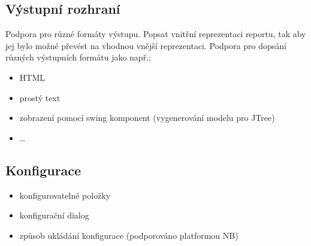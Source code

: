 \subsection{Výstupní rozhraní}
Podpora pro různé formáty výstupu. Popsat vnitřní reprezentaci reportu, tak aby jej bylo možné převést na vhodnou vnější reprezentaci. Podpora pro dopsání různých výstupních formátu jako např.:
\begin{itemize}
\item HTML
\item prostý text
\item zobrazení pomocí swing komponent (vygenerování modelu pro JTree)
\item \ldots
\end{itemize}

\subsection{Konfigurace}
\begin{itemize}
\item konfigurovatelné položky
\item konfigurační dialog
\item způsob ukládání konfigurace (podporováno platformou NB)
\end{itemize}
